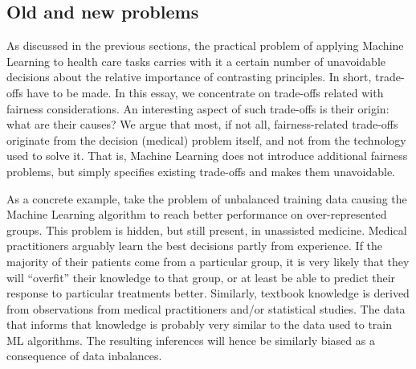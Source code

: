 \subsection{Old and new problems}
As discussed in the previous sections, the practical problem of applying Machine Learning to health care tasks carries with it a certain number of unavoidable decisions about the relative importance of contrasting principles.
In short, trade-offs have to be made.
In this essay, we concentrate on trade-offs related with fairness considerations.
An interesting aspect of such trade-offs is their origin: what are their causes?
We argue that most, if not all, fairness-related trade-offs originate from the decision (medical) problem itself, and not from the technology used to solve it.
That is, Machine Learning does not introduce additional fairness problems, but simply specifies existing trade-offs and makes them unavoidable.

As a concrete example, take the problem of unbalanced training data causing the Machine Learning algorithm to reach better performance on over-represented groups.
This problem is hidden, but still present, in unassisted medicine.
Medical practitioners arguably learn the best decisions partly from experience.
If the majority of their patients come from a particular group, it is very likely that they will ``overfit'' their knowledge to that group, or at least be able to predict their response to particular treatments better.
Similarly, textbook knowledge is derived from observations from medical practitioners and/or statistical studies.
The data that informs that knowledge is probably very similar to the data used to train ML algorithms.
The resulting inferences will hence be similarly biased as a consequence of data inbalances.

